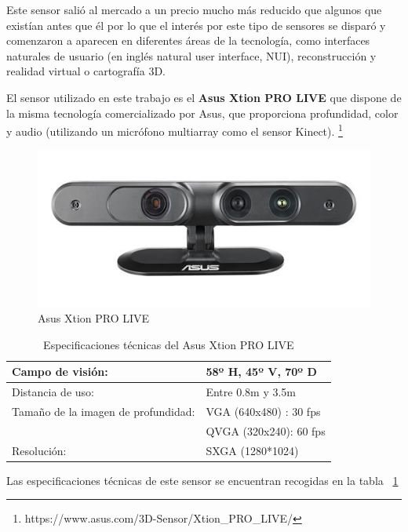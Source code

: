 Este sensor salió al mercado a un precio mucho más reducido que algunos que existían antes que él por lo que el interés por este tipo de sensores se disparó y comenzaron a aparecen en diferentes áreas de la tecnología, como interfaces naturales de usuario (en inglés natural user interface, NUI), reconstrucción y realidad virtual o cartografía 3D.

El sensor utilizado en este trabajo es el \textbf{Asus Xtion PRO LIVE} que dispone de la misma tecnología comercializado por Asus, que proporciona profundidad, color y audio (utilizando un micrófono multiarray como el sensor Kinect). \footnote{https://www.asus.com/3D-Sensor/Xtion\_PRO\_LIVE/}

\begin{figure}[th]
\centering
\includegraphics[scale=0.85]{Figures/xtion-pro-live.jpg}
\decoRule
\caption[Kinect sensor]{Asus Xtion PRO LIVE}
\label{fig:Kinect}
\end{figure}


\begin{table}
\caption{Especificaciones técnicas del Asus Xtion PRO LIVE}
\label{tab:xtion}
\centering
\begin{tabular}{ l | l }
\toprule
Campo de visión: & 58º H, 45º V, 70º D\\
\hline
Distancia de uso: & Entre 0.8m y 3.5m\\
\hline
Tamaño de la imagen de profundidad: & VGA (640x480) : 30 fps \\
				& QVGA (320x240): 60 fps\\
\hline
Resolución: & SXGA (1280*1024) \\
\bottomrule
\end{tabular}
\end{table}

Las especificaciones técnicas de este sensor se encuentran recogidas en la tabla ~\ref{tab:xtion}

